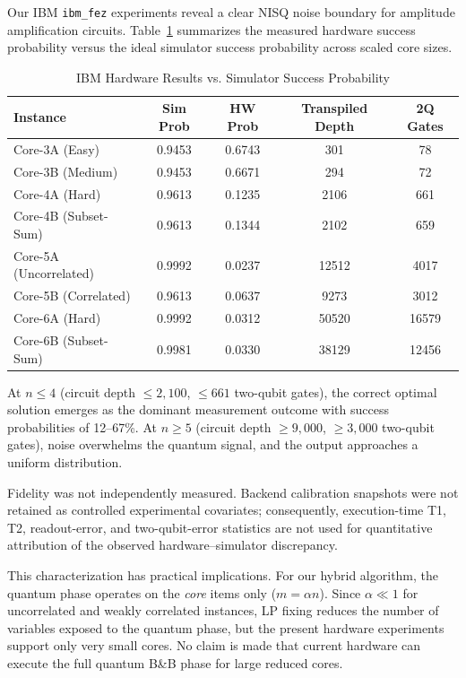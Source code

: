 \documentclass[conference]{IEEEtran} \IEEEoverridecommandlockouts
\begin{document}
Our IBM \texttt{ibm\_fez} experiments reveal a clear NISQ noise boundary for amplitude amplification circuits. Table~\ref{tab:hardware} summarizes the measured hardware success probability versus the ideal simulator success probability across scaled core sizes.

\begin{table}[htbp]
\caption{IBM Hardware Results vs. Simulator Success Probability}
\label{tab:hardware}
\begin{center}
\footnotesize
\begin{tabular}{lcccc}
\toprule
\textbf{Instance} & \textbf{Sim Prob} & \textbf{HW Prob} & \textbf{Transpiled Depth} & \textbf{2Q Gates} \\
\midrule
Core-3A (Easy) & 0.9453 & 0.6743 & 301 & 78 \\
Core-3B (Medium) & 0.9453 & 0.6671 & 294 & 72 \\
Core-4A (Hard) & 0.9613 & 0.1235 & 2106 & 661 \\
Core-4B (Subset-Sum) & 0.9613 & 0.1344 & 2102 & 659 \\
Core-5A (Uncorrelated) & 0.9992 & 0.0237 & 12512 & 4017 \\
Core-5B (Correlated) & 0.9613 & 0.0637 & 9273 & 3012 \\
Core-6A (Hard) & 0.9992 & 0.0312 & 50520 & 16579 \\
Core-6B (Subset-Sum) & 0.9981 & 0.0330 & 38129 & 12456 \\
\bottomrule
\end{tabular}
\end{center}
\end{table}

At $n \leq 4$ (circuit depth $\leq 2{,}100$, $\leq 661$ two-qubit gates), the correct optimal solution emerges as the dominant measurement outcome with success probabilities of 12--67\%. At $n \geq 5$ (circuit depth $\geq 9{,}000$, $\geq 3{,}000$ two-qubit gates), noise overwhelms the quantum signal, and the output approaches a uniform distribution.

Fidelity was not independently measured. Backend calibration snapshots were not retained as controlled experimental covariates; consequently, execution-time T1, T2, readout-error, and two-qubit-error statistics are not used for quantitative attribution of the observed hardware--simulator discrepancy.

This characterization has practical implications. For our hybrid algorithm, the quantum phase operates on the \textit{core} items only ($m = \alpha n$). Since $\alpha \ll 1$ for uncorrelated and weakly correlated instances, LP fixing reduces the number of variables exposed to the quantum phase, but the present hardware experiments support only very small cores. No claim is made that current hardware can execute the full quantum B\&B phase for large reduced cores.
\end{document}
